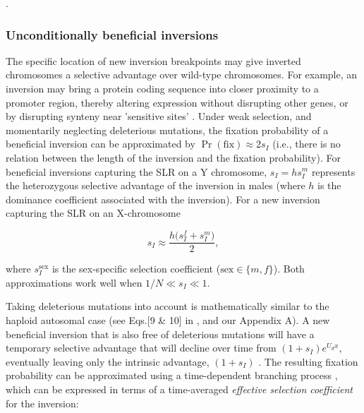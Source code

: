 \documentclass[11pt]{article}
\begin{document}
.


\subsubsection*{Unconditionally beneficial inversions}

The specific location of new inversion breakpoints may give inverted chromosomes a selective advantage over wild-type chromosomes. For example, an inversion may bring a protein coding sequence into closer proximity to a promoter region, thereby altering expression without disrupting other genes, or by disrupting synteny near 'sensitive sites' \citep{KrimbasPowell1992, CorbettDetig2016}. Under weak selection, and momentarily neglecting deleterious mutations, the fixation probability of a beneficial inversion can be approximated by $\Pr(\text{fix}) \approx 2 s_{I}$ \citep{Haldane1927} (i.e., there is no relation between the length of the inversion and the fixation probability). For beneficial inversions capturing the SLR on a Y chromosome, $s_I = h s_{I}^{m}$ represents the heterozygous selective advantage of the inversion in males (where $h$ is the dominance coefficient associated with the inversion). For a new inversion capturing the SLR on an X-chromosome

\begin{equation} \label{eq:benXlinkednoDel}
	s_{I} \approx \frac{h \big( s_{I}^{f} + s_{I}^{m} \big)}{2},
\end{equation}

\noindent where $s_{I}^{\text{sex}}$ is the sex-specific selection coefficient ($\text{sex} \in \{m,f\}$). Both approximations work well when $1/N \ll s_I \ll 1$.

Taking deleterious mutations into account is mathematically similar to the haploid autosomal case (see Eqs.[9 \& 10] in \citealt{ConnallonOlito2021}, and our Appendix A). A new beneficial inversion that is also free of deleterious mutations will have a temporary selective advantage that will decline over time from $(1 + s_I)e^{U_d x}$, eventually leaving only the intrinsic advantage, $(1 + s_I)$ \citep{Nei1967}. The resulting fixation probability can be approximated using a time-dependent branching process \citep{PeischlKirkpatrick2012, KirkpatrickPeischl2013}, which can be expressed in terms of a time-averaged {\itshape effective selection coefficient} for the inversion:
\end{document}
